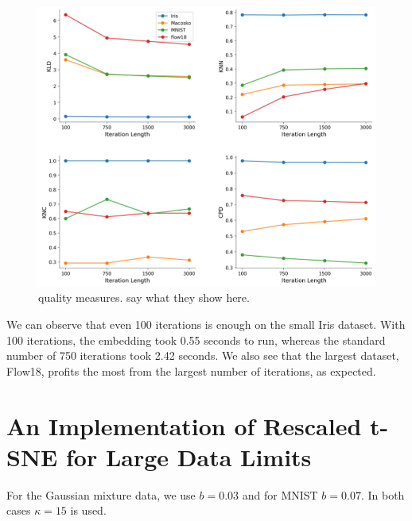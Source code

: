 \begin{figure}[h]
    \centering 
        \includegraphics[width=\linewidth]{figures/n_iter/n_iter_4_quality_measures.png}
        \caption{quality measures. say what they show here.}
    \label{fig:n_iter-quality}
\end{figure}

We can observe that even 100 iterations is enough on the small Iris dataset. 
With 100 iterations, the embedding took 0.55 seconds to run, whereas the standard number of 750 iterations took 2.42 seconds. 
We also see that the largest dataset, Flow18, profits the most from the largest number of iterations, as expected. 

\newpage 
\section{An Implementation of Rescaled t-SNE for Large Data Limits}
For the Gaussian mixture data, we use $b=0.03$ and for MNIST $b=0.07$. In both cases $\kappa=15$ is used. 

